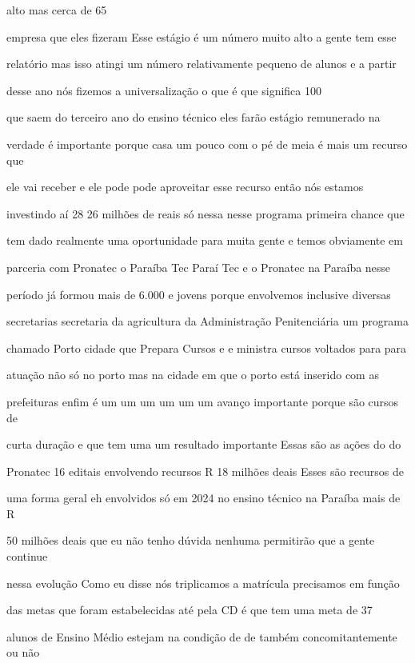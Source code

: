 \documentclass[a4paper,12pt]{article}
\begin{document}
alto mas cerca de 65%

empresa que eles fizeram Esse estágio é um número muito alto a gente tem esse

relatório mas isso atingi um número relativamente pequeno de alunos e a partir

desse ano nós fizemos a universalização o que é que significa 100%

que saem do terceiro ano do ensino técnico eles farão estágio remunerado na

verdade é importante porque casa um pouco com o pé de meia é mais um recurso que

ele vai receber e ele pode pode aproveitar esse recurso então nós estamos

investindo aí 28 26 milhões de reais só nessa nesse programa primeira chance que

tem dado realmente uma oportunidade para muita gente e temos obviamente em

parceria com Pronatec o Paraíba Tec Paraí Tec e o Pronatec na Paraíba nesse

período já formou mais de 6.000 e jovens porque envolvemos inclusive diversas

secretarias secretaria da agricultura da Administração Penitenciária um programa

chamado Porto cidade que Prepara Cursos e e ministra cursos voltados para para

atuação não só no porto mas na cidade em que o porto está inserido com as

prefeituras enfim é um um um um um um avanço importante porque são cursos de

curta duração e que tem uma um resultado importante Essas são as ações do do

Pronatec 16 editais envolvendo recursos R 18 milhões deais Esses são recursos de

uma forma geral eh envolvidos só em 2024 no ensino técnico na Paraíba mais de R

50 milhões deais que eu não tenho dúvida nenhuma permitirão que a gente continue

nessa evolução Como eu disse nós triplicamos a matrícula precisamos em função

das metas que foram estabelecidas até pela CD é que tem uma meta de 37%

alunos de Ensino Médio estejam na condição de de também concomitantemente ou não
\end{document}
